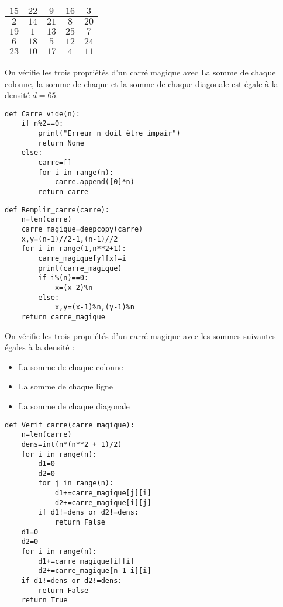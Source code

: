 \exer{}
\setcounter{numques}{0}

\question{}

\renewcommand{\arraystretch}{1.2}
		\begin{tabular}{|*{5}{c|}}
			\hline
			$15$ & $22$ & $9$ & $16$ &$~3~$\\
			\hline
			$~2~$& $14$ & $21$ & $8$ & $20$ \\
			\hline
			 $19$  &$~1~$& $13$  & $25$  & $7$   \\
			\hline
			$~6~$& $18$ &$~5~$& $12$ & $24$ \\
			\hline
			 $23$ & $10$ & $17$ &$~4~$& $11$ \\
			\hline
		\end{tabular}
\renewcommand{\arraystretch}{1}

On vérifie les trois propriétés d'un carré magique avec La somme de chaque colonne, la somme de chaque et la somme de chaque diagonale est égale à la densité $d=65$.

\question{}

\begin{lstlisting}
def Carre_vide(n):
    if n%2==0:
        print("Erreur n doit être impair")
        return None
    else:
        carre=[]
        for i in range(n):
            carre.append([0]*n)
        return carre
\end{lstlisting}


\question{}

\begin{lstlisting}
def Remplir_carre(carre):
    n=len(carre)
    carre_magique=deepcopy(carre)
    x,y=(n-1)//2-1,(n-1)//2
    for i in range(1,n**2+1):
        carre_magique[y][x]=i
        print(carre_magique)
        if i%(n)==0:
            x=(x-2)%n
        else:
            x,y=(x-1)%n,(y-1)%n
    return carre_magique
\end{lstlisting}


\question{}

On vérifie les trois propriétés d'un carré magique avec les sommes suivantes égales à la densité :
\begin{itemize}
\item La somme de chaque colonne
\item La somme de chaque ligne
\item La somme de chaque diagonale
\end{itemize}

\begin{lstlisting}
def Verif_carre(carre_magique):
    n=len(carre)
    dens=int(n*(n**2 + 1)/2)
    for i in range(n):
        d1=0
        d2=0
        for j in range(n):
            d1+=carre_magique[j][i]
            d2+=carre_magique[i][j]
        if d1!=dens or d2!=dens:
            return False
    d1=0
    d2=0
    for i in range(n):
        d1+=carre_magique[i][i]
        d2+=carre_magique[n-1-i][i]
    if d1!=dens or d2!=dens:
        return False
    return True
\end{lstlisting}